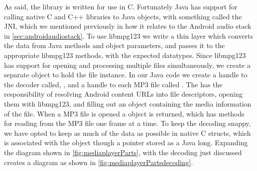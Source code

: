As said, the library is written for use in C. Fortunately Java has
support for calling native C and C++ libraries to Java objects, with
something called the \ac{JNI}, which we mentioned previously in how it relates to the Android audio stack in \cref{sec:androidaudiostack}.
To use libmpg123 we write a thin
layer which converts the data from Java methods and object parameters,
and passes it to the appropriate libmpg123 methods, with the expected
datatypes. Since libmpg123 has support for opening and processing
multiple files simultaneously, we create a separate object to hold the
file instance. In our Java code we create a handle to the decoder called, ,
and a handle to each MP3 file called .
The  has the responsibility
of resolving Android content URLs into file descriptors, opening them
with libmpg123, and filling out an object containing the media
information of the file. When a MP3 file is opened a 
object is returned, which has methods for reading from the MP3 file one
frame at a time. To keep the decoding snappy, we have opted to keep as
much of the data as possible in native C structs, which is associated
with the  object though a pointer stored as a Java long.
Expanding the diagram shown in \cref{fig:mediaplayerParts}, with the
decoding just discussed creates a diagram as shown in
\cref{fig:mediaplayerPartsdecoding}.

